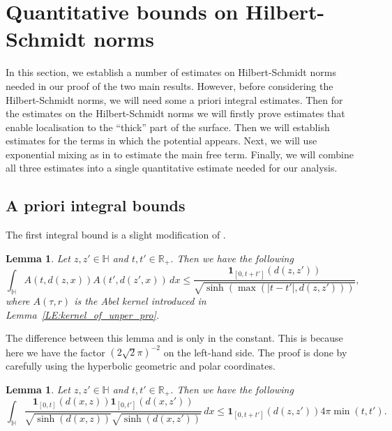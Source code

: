 \documentclass[11pt,twoside,reqno]{amsart}
\newcommand{\R}{\mathbb{R}}
\newcommand{\bH}{\mathbb{H}}
\newcommand{\1}{\mathrm{\mathbf{1}}}
\numberwithin{equation}{section}
\theoremstyle{plain}
\newtheorem{lemma}[thm]{Lemma}
\theoremstyle{definition}
\theoremstyle{remark}
\begin{document}
 



 








\section{Quantitative bounds on Hilbert-Schmidt norms}\label{sec:Hilbert_Schmidt_norm_bounds}
In this section, we establish a number of estimates on Hilbert-Schmidt norms needed in our proof of the two main results. However, before considering the Hilbert-Schmidt norms, we will need some a priori integral estimates. Then for the estimates on the Hilbert-Schmidt norms we will firstly prove estimates that enable localisation to the ``thick'' part of the surface. Then we will establish estimates for the terms in which the potential appears. Next, we will use exponential mixing as in \cite{Hippi} to estimate the main free term. Finally, we will combine all three estimates into a single quantitative estimate needed for our analysis.  

\subsection{A priori integral bounds}
The first integral bound is a slight modification of \cite[Proposition 7.2]{Hippi}.

\begin{lemma}\label{LE:Two_abel_kernel_int_est}
Let $z,z'\in\bH$ and $t,t'\in \R_{+}$. Then we have the following
\begin{equation*}
    \int_{\bH} A(t,d(z,x))A(t',d(z',x)) \, d x \leq \frac{ \boldsymbol{1}_{[0,t+t']}(d(z,z'))}{\sqrt{\sinh (\max(|t-t'|,d(z,z')))}},
\end{equation*}
where $A(\tau,r)$ is the Abel kernel introduced in Lemma~\ref{LE:kernel_of_unper_pro}.
\end{lemma}
The difference between this lemma and \cite[Proposition 7.2]{Hippi} is only in the constant. This is because here we have the factor $(2\sqrt2 \pi)^{-2}$ on the left-hand side. The proof is done by carefully using the hyperbolic geometric and polar coordinates.    

\begin{lemma}\label{LE:Two_sqr_sinh_singu_1}
Let $z,z'\in\bH$ and $t,t'\in \R_{+}$. Then we have the following
\begin{equation*}
    \int_{\bH} \frac{\boldsymbol{1}_{[0,t]}(d(x,z))\boldsymbol{1}_{[0,t']}(d(x,z'))}{\sqrt{\sinh(d(x,z)) }\sqrt{\sinh(d(x,z')) }} \, d x \leq  \boldsymbol{1}_{[0,t+t']}(d(z,z')) 4\pi \min(t,t').
\end{equation*}
\end{lemma}
\end{document}
